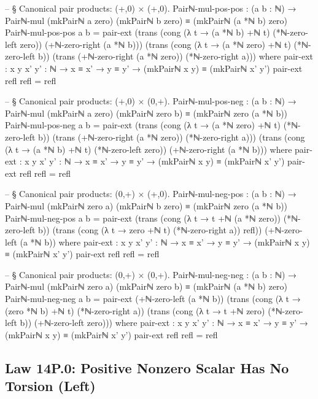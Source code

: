 \documentclass[11pt,a4paper]{book}
\begin{document}
\begin{code}
-- § Canonical pair products: (+,0) × (+,0).
Pairℕ-mul-pos-pos : (a b : ℕ) →
  Pairℕ-mul (mkPairℕ a zero) (mkPairℕ b zero) ≡ (mkPairℕ (a *ℕ b) zero)
Pairℕ-mul-pos-pos a b =
  pair-ext
    (trans
      (cong (λ t → (a *ℕ b) +ℕ t) (*ℕ-zero-left zero))
      (+ℕ-zero-right (a *ℕ b)))
    (trans
      (cong (λ t → (a *ℕ zero) +ℕ t) (*ℕ-zero-left b))
      (trans
        (+ℕ-zero-right (a *ℕ zero))
        (*ℕ-zero-right a)))
  where
    pair-ext : {x y x' y' : ℕ} → x ≡ x' → y ≡ y' → (mkPairℕ x y) ≡ (mkPairℕ x' y')
    pair-ext refl refl = refl

-- § Canonical pair products: (+,0) × (0,+).
Pairℕ-mul-pos-neg : (a b : ℕ) →
  Pairℕ-mul (mkPairℕ a zero) (mkPairℕ zero b) ≡ (mkPairℕ zero (a *ℕ b))
Pairℕ-mul-pos-neg a b =
  pair-ext
    (trans
      (cong (λ t → (a *ℕ zero) +ℕ t) (*ℕ-zero-left b))
      (trans
        (+ℕ-zero-right (a *ℕ zero))
        (*ℕ-zero-right a)))
    (trans
      (cong (λ t → (a *ℕ b) +ℕ t) (*ℕ-zero-left zero))
      (+ℕ-zero-right (a *ℕ b)))
  where
    pair-ext : {x y x' y' : ℕ} → x ≡ x' → y ≡ y' → (mkPairℕ x y) ≡ (mkPairℕ x' y')
    pair-ext refl refl = refl

-- § Canonical pair products: (0,+) × (+,0).
Pairℕ-mul-neg-pos : (a b : ℕ) →
  Pairℕ-mul (mkPairℕ zero a) (mkPairℕ b zero) ≡ (mkPairℕ zero (a *ℕ b))
Pairℕ-mul-neg-pos a b =
  pair-ext
    (trans
      (cong (λ t → t +ℕ (a *ℕ zero)) (*ℕ-zero-left b))
      (trans
        (cong (λ t → zero +ℕ t) (*ℕ-zero-right a))
        refl))
    (+ℕ-zero-left (a *ℕ b))
  where
    pair-ext : {x y x' y' : ℕ} → x ≡ x' → y ≡ y' → (mkPairℕ x y) ≡ (mkPairℕ x' y')
    pair-ext refl refl = refl

-- § Canonical pair products: (0,+) × (0,+).
Pairℕ-mul-neg-neg : (a b : ℕ) →
  Pairℕ-mul (mkPairℕ zero a) (mkPairℕ zero b) ≡ (mkPairℕ (a *ℕ b) zero)
Pairℕ-mul-neg-neg a b =
  pair-ext
    (+ℕ-zero-left (a *ℕ b))
    (trans
      (cong (λ t → (zero *ℕ b) +ℕ t) (*ℕ-zero-right a))
      (trans
        (cong (λ t → t +ℕ zero) (*ℕ-zero-left b))
        (+ℕ-zero-left zero)))
  where
    pair-ext : {x y x' y' : ℕ} → x ≡ x' → y ≡ y' → (mkPairℕ x y) ≡ (mkPairℕ x' y')
    pair-ext refl refl = refl
\end{code}

\subsection{Law 14P.0: Positive Nonzero Scalar Has No Torsion (Left)}
\end{document}
